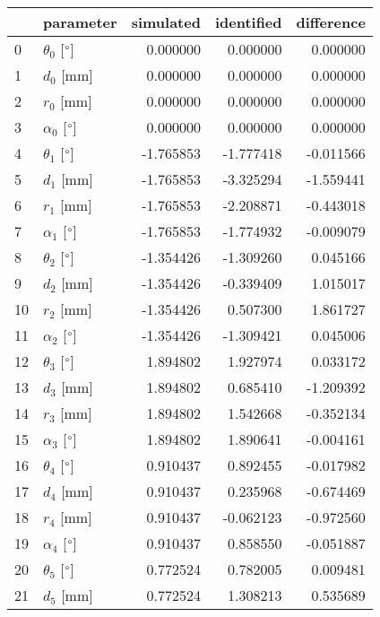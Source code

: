 \documentclass{standalone}%
\begin{document}
%
\normalsize%
\begin{tabular}{llrrr}
\toprule
{} &                 parameter & simulated & identified & difference \\
\midrule
0  &  $\theta_{0}$ [$\degree$] &  0.000000 &   0.000000 &   0.000000 \\
1  &              $d_{0}$ [mm] &  0.000000 &   0.000000 &   0.000000 \\
2  &              $r_{0}$ [mm] &  0.000000 &   0.000000 &   0.000000 \\
3  &  $\alpha_{0}$ [$\degree$] &  0.000000 &   0.000000 &   0.000000 \\
4  &  $\theta_{1}$ [$\degree$] & -1.765853 &  -1.777418 &  -0.011566 \\
5  &              $d_{1}$ [mm] & -1.765853 &  -3.325294 &  -1.559441 \\
6  &              $r_{1}$ [mm] & -1.765853 &  -2.208871 &  -0.443018 \\
7  &  $\alpha_{1}$ [$\degree$] & -1.765853 &  -1.774932 &  -0.009079 \\
8  &  $\theta_{2}$ [$\degree$] & -1.354426 &  -1.309260 &   0.045166 \\
9  &              $d_{2}$ [mm] & -1.354426 &  -0.339409 &   1.015017 \\
10 &              $r_{2}$ [mm] & -1.354426 &   0.507300 &   1.861727 \\
11 &  $\alpha_{2}$ [$\degree$] & -1.354426 &  -1.309421 &   0.045006 \\
12 &  $\theta_{3}$ [$\degree$] &  1.894802 &   1.927974 &   0.033172 \\
13 &              $d_{3}$ [mm] &  1.894802 &   0.685410 &  -1.209392 \\
14 &              $r_{3}$ [mm] &  1.894802 &   1.542668 &  -0.352134 \\
15 &  $\alpha_{3}$ [$\degree$] &  1.894802 &   1.890641 &  -0.004161 \\
16 &  $\theta_{4}$ [$\degree$] &  0.910437 &   0.892455 &  -0.017982 \\
17 &              $d_{4}$ [mm] &  0.910437 &   0.235968 &  -0.674469 \\
18 &              $r_{4}$ [mm] &  0.910437 &  -0.062123 &  -0.972560 \\
19 &  $\alpha_{4}$ [$\degree$] &  0.910437 &   0.858550 &  -0.051887 \\
20 &  $\theta_{5}$ [$\degree$] &  0.772524 &   0.782005 &   0.009481 \\
21 &              $d_{5}$ [mm] &  0.772524 &   1.308213 &   0.535689 \\

\end{tabular}
\end{document}
